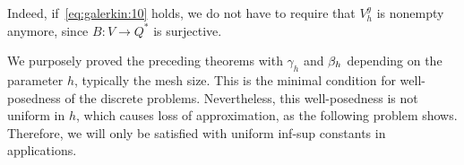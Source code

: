 \begin{remark}
  Indeed, if~\eqref{eq:galerkin:10} holds, we do not have to require
  that $V_h^g$ is nonempty anymore, since $B\colon V\to Q^*$ is
  surjective.
\end{remark}

\begin{remark}
  We purposely proved the preceding theorems with $\gamma_h$ and
  $\beta_h$ depending on the parameter $h$, typically the mesh
  size. This is the minimal condition for well-posedness of the
  discrete problems. Nevertheless, this well-posedness is not uniform
  in $h$, which causes loss of approximation, as the following problem
  shows. Therefore, we will only be satisfied with uniform inf-sup
  constants in applications.
\end{remark}

